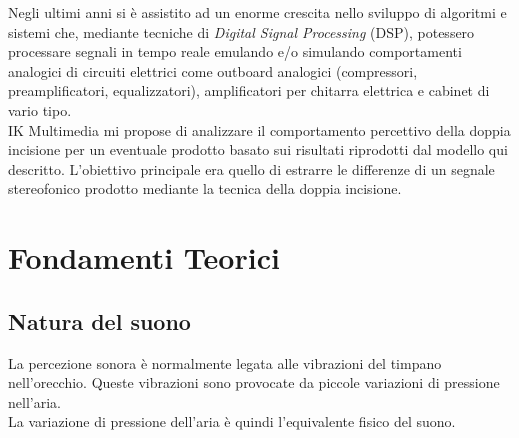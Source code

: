 \documentclass[12pt]{report}
\begin{document}
Negli ultimi anni si è assistito ad un enorme crescita nello sviluppo di algoritmi e sistemi che, mediante tecniche di {\itshape Digital Signal Processing} (DSP), potessero processare segnali in tempo reale emulando e/o simulando comportamenti analogici di circuiti elettrici come outboard analogici (compressori, preamplificatori, equalizzatori), amplificatori per chitarra elettrica e cabinet di vario tipo.\\
IK Multimedia mi propose di analizzare il comportamento percettivo della doppia incisione per un eventuale prodotto basato sui risultati riprodotti dal modello qui descritto. L'obiettivo principale era quello di estrarre le differenze di un segnale stereofonico prodotto mediante la tecnica della doppia incisione.

\chapter{Fondamenti Teorici}
\label{cap2}

	\section{Natura del suono}
	\label{cap2sec1}
		La percezione sonora è normalmente legata alle vibrazioni del timpano nell'orecchio. Queste vibrazioni sono provocate da piccole variazioni di pressione nell'aria.\\
La variazione di pressione dell'aria è quindi l'equivalente fisico del suono.
\end{document}
